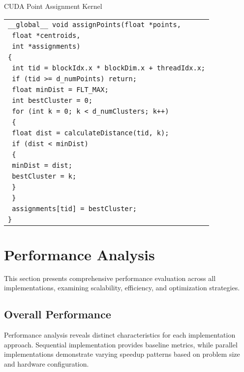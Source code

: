 \documentclass[10pt,a4paper,twocolumn]{article}
\makeatletter
\newcounter{alglineno}
\newenvironment{algtabular}{%
\setcounter{alglineno}{0}%
\begin{tabular}{@{\stepcounter{alglineno}\makebox[1.2em][r]{\tiny\thealglineno:}\hspace{0.2em}}l@{}}%
}{%
\end{tabular}%
}
\makeatother
\begin{document}
\begin{algorithm}[H]
\caption{CUDA Point Assignment Kernel}
\label{alg:cuda_kernel}
\begin{algtabular}
\texttt{\_\_global\_\_ void assignPoints(float *points,} \\
\texttt{                              float *centroids,} \\
\texttt{                              int *assignments)} \\
\texttt{\{} \\
\texttt{  int tid = blockIdx.x * blockDim.x + threadIdx.x;} \\
\texttt{  if (tid >= d\_numPoints) return;} \\
\texttt{  float minDist = FLT\_MAX;} \\
\texttt{  int bestCluster = 0;} \\
\texttt{  for (int k = 0; k < d\_numClusters; k++)} \\
\texttt{  \{} \\
\texttt{    float dist = calculateDistance(tid, k);} \\
\texttt{    if (dist < minDist)} \\
\texttt{    \{} \\
\texttt{      minDist = dist;} \\
\texttt{      bestCluster = k;} \\
\texttt{    \}} \\
\texttt{  \}} \\
\texttt{  assignments[tid] = bestCluster;} \\
\texttt{\}} \\
\end{algtabular}
\end{algorithm}

\section{Performance Analysis}

This section presents comprehensive performance evaluation across all implementations, examining scalability, efficiency, and optimization strategies.

\subsection{Overall Performance}

Performance analysis reveals distinct characteristics for each implementation approach. Sequential implementation provides baseline metrics, while parallel implementations demonstrate varying speedup patterns based on problem size and hardware configuration.
\end{document}
